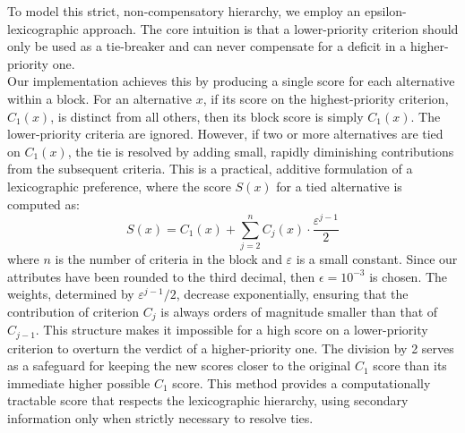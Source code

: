 To model this strict, non-compensatory hierarchy, we employ an epsilon-lexicographic approach. The core intuition is that a lower-priority criterion should only be used as a tie-breaker and can never compensate for a deficit in a higher-priority one.\\



Our implementation achieves this by producing a single score for each alternative within a block. For an alternative $x$, if its score on the highest-priority criterion, $C_1(x)$, is distinct from all others, then its block score is simply $C_1(x)$. The lower-priority criteria are ignored. However, if two or more alternatives are tied on $C_1(x)$, the tie is resolved by adding small, rapidly diminishing contributions from the subsequent criteria. This is a practical, additive formulation of a lexicographic preference, where the score $S(x)$ for a tied alternative is computed as:
\begin{equation}
S(x) = C_1(x) + \sum_{j=2}^{n} C_j(x) \cdot \frac{\varepsilon^{j-1}}{2}
\end{equation}
where $n$ is the number of criteria in the block and $\varepsilon$ is a small constant. Since our attributes have been rounded to the third decimal, then $\epsilon = 10^{-3}$ is chosen. The weights, determined by $\varepsilon^{j-1}/2$, decrease exponentially, ensuring that the contribution of criterion $C_j$ is always orders of magnitude smaller than that of $C_{j-1}$. This structure makes it impossible for a high score on a lower-priority criterion to overturn the verdict of a higher-priority one. The division by 2 serves as a safeguard for keeping the new scores closer to the original $C_1$ score than its immediate higher possible $C_1$ score. This method provides a computationally tractable score that respects the lexicographic hierarchy, using secondary information only when strictly necessary to resolve ties.\\

